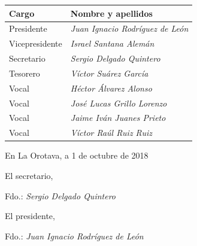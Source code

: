 \documentclass[a4paper, 12pt, oneside]{book}
\begin{document}
\begin{table}[H]
    \begin{tabular}{l|l}
        {\bf Cargo} & {\bf Nombre y apellidos}\\
        \hline
        Presidente & \textit{Juan Ignacio Rodríguez de León}\\
        Vicepresidente & \textit{Israel Santana Alemán}\\
        Secretario & \textit{Sergio Delgado Quintero}\\
        Tesorero & \textit{Víctor Suárez García}\\
        \hline
        Vocal & \textit{Héctor Álvarez Alonso}\\
        Vocal & \textit{José Lucas Grillo Lorenzo}\\
        Vocal & \textit{Jaime Iván Juanes Prieto}\\
        Vocal & \textit{Víctor Raúl Ruiz Ruiz}\\
        \hline
    \end{tabular}
\end{table}

\begin{flushright}
    En La Orotava, a 1 de octubre de 2018
\end{flushright}

\vspace{15mm}

\begin{multicols}{2}
    \noindent
    El secretario,

    \vspace{25mm}

    \noindent
    Fdo.: \textit{Sergio Delgado Quintero}

    \vfill\null
    \columnbreak
    \begin{flushright}
        El presidente,
    
        \vspace{25mm}
    
        \noindent
        Fdo.: \textit{Juan Ignacio Rodríguez de León}
    \end{flushright}
\end{multicols}
\end{document}
